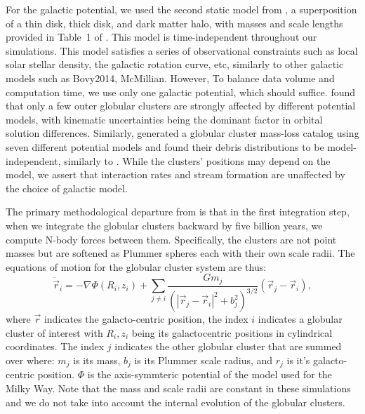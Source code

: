 \documentclass{aa}
\begin{document}
    For the galactic potential, we used the second static model from \citet{2017A&A...598A..66P}, a superposition of a thin disk, thick disk, and dark matter halo, with masses and scale lengths provided in Table~1 of \citet{2023A&A...673A..44F}. This model is time-independent throughout our simulations. This model satisfies a series of observational constraints such as local solar stellar density, the galactic rotation curve, etc, similarly to other galactic models such as Bovy2014, McMillian. However, To balance data volume and computation time, we use only one galactic potential, which should suffice. \citet{2021MNRAS.505.5978V} found that only a few outer globular clusters are strongly affected by different potential models, with kinematic uncertainties being the dominant factor in orbital solution differences. Similarly, \citet{2024MNRAS.528.5189G} generated a globular cluster mass-loss catalog using seven different potential models and found their debris distributions to be model-independent, similarly to \citet{2023A&A...673A..44F}. While the clusters' positions may depend on the model, we assert that interaction rates and stream formation are unaffected by the choice of galactic model.    

    The primary methodological departure from \citet{2023A&A...673A..44F} is that in the first integration step, when we integrate the globular clusters backward by five billion years, we compute N-body forces between them. Specifically, the clusters are not point masses but are softened as Plummer spheres each with their own scale radii. The equations of motion for the globular cluster system are thus: 
    \begin{equation}
      \ddot{\vec{r}}_i = -\nabla \Phi(R_i,z_i) + \left.\sum_{j\neq i} \frac{Gm_j}{\left(|\vec{r}_j - \vec{r}_i|^2 + b_j^2\right)^{3/2}}\right. \left(\vec{r}_j - \vec{r}_i\right),
    \end{equation}\label{eq:GCNBody} where $\vec{r}$ indicates the galacto-centric position, the index $i$ indicates a globular cluster of interest with $R_i,z_i$ being its galactocentric positions in cylindrical coordinates. The index $j$ indicates the other globular cluster that are summed over where: $m_j$ is its mass, $b_j$ is its Plummer scale radius, and $r_j$ is it's galacto-centric position. $\Phi$ is the axis-symmteric potential of the model used for the Milky Way. Note that the mass and scale radii are constant in these simulations and we do not take into account the internal evolution of the globular clusters. 
\end{document}

